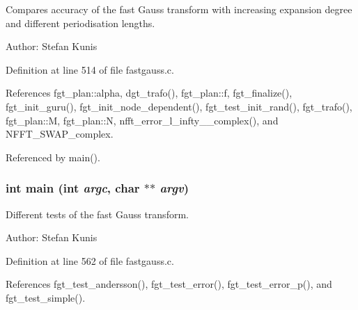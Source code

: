 Compares accuracy of the fast Gauss transform with increasing expansion degree and different periodisation lengths. 

\begin{Desc}
\item[Author:]Stefan Kunis \end{Desc}


Definition at line 514 of file fastgauss.c.

References fgt\_\-plan::alpha, dgt\_\-trafo(), fgt\_\-plan::f, fgt\_\-finalize(), fgt\_\-init\_\-guru(), fgt\_\-init\_\-node\_\-dependent(), fgt\_\-test\_\-init\_\-rand(), fgt\_\-trafo(), fgt\_\-plan::M, fgt\_\-plan::N, nfft\_\-error\_\-l\_\-infty\_\_\-complex(), and NFFT\_\-SWAP\_\-complex.

Referenced by main().\hypertarget{group__applications__fastgauss_ga12}{
\subsubsection[main]{\setlength{\rightskip}{0pt plus 5cm}int main (int {\em argc}, char $\ast$$\ast$ {\em argv})}}
\label{group__applications__fastgauss_ga12}


Different tests of the fast Gauss transform. 

\begin{Desc}
\item[Author:]Stefan Kunis \end{Desc}


Definition at line 562 of file fastgauss.c.

References fgt\_\-test\_\-andersson(), fgt\_\-test\_\-error(), fgt\_\-test\_\-error\_\-p(), and fgt\_\-test\_\-simple().